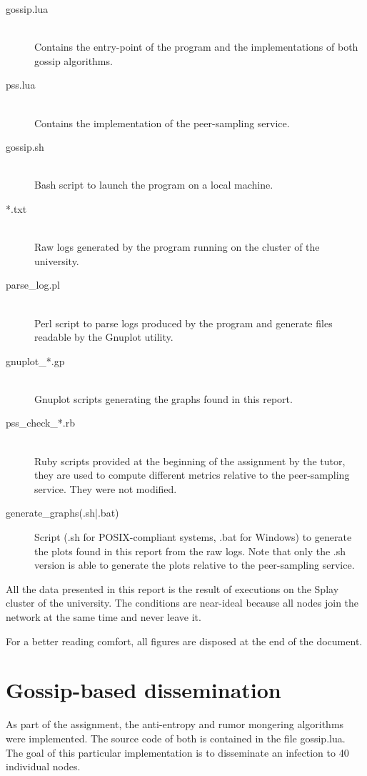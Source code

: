 \documentclass[11pt,a4paper]{scrartcl}
\begin{document}
\begin{description}
\item[gossip.lua]\hfill\\ Contains the entry-point of the program and the implementations of both gossip algorithms.
\item[pss.lua]\hfill\\ Contains the implementation of the peer-sampling service.
\item[gossip.sh]\hfill\\ Bash script to launch the program on a local machine.
\item[*.txt]\hfill\\ Raw logs generated by the program running on the cluster of the university.
\item[parse\_log.pl]\hfill\\ Perl script to parse logs produced by the program and generate files readable by the Gnuplot utility.
\item[gnuplot\_*.gp]\hfill\\ Gnuplot scripts generating the graphs found in this report.
\item[pss\_check\_*.rb]\hfill\\ Ruby scripts provided at the beginning of the assignment by the tutor, they are used to compute different metrics relative to the peer-sampling service. They were not modified.
\item[generate\_graphs(.sh|.bat)] Script (\textsf{.sh} for POSIX-compliant systems, \textsf{.bat} for Windows) to generate the plots found in this report from the raw logs. Note that only the \textsf{.sh} version is able to generate the plots relative to the peer-sampling service.
\end{description}

All the data presented in this report is the result of executions on the Splay cluster of the university. The conditions are near-ideal because all nodes join the network at the same time and never leave it.

For a better reading comfort, all figures are disposed at the end of the document.

\section{Gossip-based dissemination}

As part of the assignment, the anti-entropy and rumor mongering algorithms were implemented. The source code of both is contained in the file \textsf{gossip.lua}. The goal of this particular implementation is to disseminate an infection to 40 individual nodes.
\end{document}
